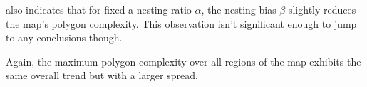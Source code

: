  also indicates that for fixed a nesting ratio $\alpha$, the nesting bias $\beta$ slightly reduces the map's polygon complexity.
This observation isn't significant enough to jump to any conclusions though.

Again, the maximum polygon complexity over all regions of the map exhibits the same overall trend but with a larger spread.




\clearpage
{}

